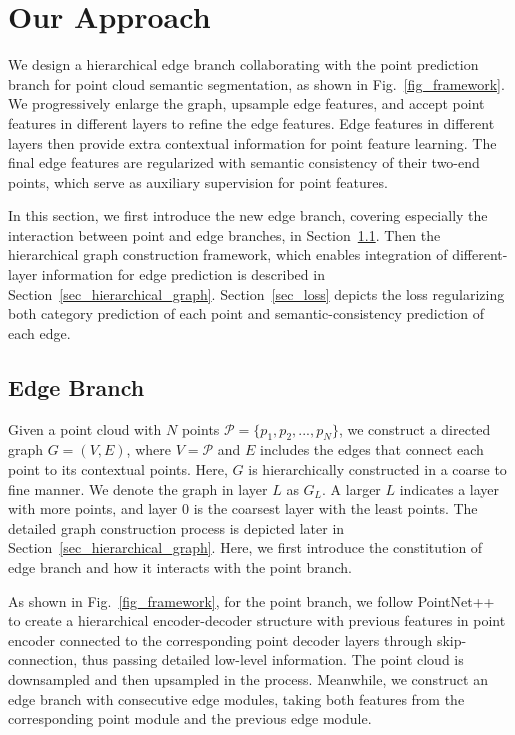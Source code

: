 \documentclass[10pt,twocolumn,letterpaper]{article}
\begin{document}
\section{Our Approach}

We design a hierarchical edge branch collaborating with the point prediction branch for point cloud semantic segmentation, as shown in Fig.~\ref{fig_framework}. 
We progressively enlarge the graph, upsample edge features, and accept point features in different layers to refine the edge features. Edge features in different layers then provide extra contextual information for point feature learning. The final edge features are regularized with semantic consistency of their two-end points, which serve as auxiliary supervision for point features.  

In this section, we first introduce the new edge branch, covering especially the interaction between point and edge branches, in Section~\ref{sec_edge_branch}.
Then the hierarchical graph construction framework, which enables integration of different-layer information for edge prediction is described in Section~\ref{sec_hierarchical_graph}. Section~\ref{sec_loss} depicts the loss regularizing both category prediction of each point and semantic-consistency prediction of each edge.


\subsection{Edge Branch}
\label{sec_edge_branch}

Given a point cloud with $N$ points $\mathcal{P} = \{p_1, p_2, ..., p_N\}$, we construct a directed graph $G = (V, E)$, where $V = \mathcal{P}$ and $E$ includes the edges that connect each point to its contextual points. Here, $G$ is hierarchically constructed in a coarse to fine manner.
We denote the graph in layer $L$ as $G_L$. A larger $L$ indicates a layer with more points, and layer $0$ is the coarsest layer with the least points. The detailed graph construction process is depicted later in Section~\ref{sec_hierarchical_graph}. Here, we first introduce the constitution of edge branch and how it interacts with the point branch.

As shown in Fig.~\ref{fig_framework}, for the point branch, we follow PointNet++~\cite{pointnet2} to create a hierarchical encoder-decoder structure with previous features in point encoder connected to the corresponding point decoder layers through skip-connection, thus passing detailed low-level information. The point cloud is downsampled and then upsampled in the process. Meanwhile, we construct an edge branch with consecutive edge modules, taking both features from the corresponding point module and the previous edge module. 
\end{document}
